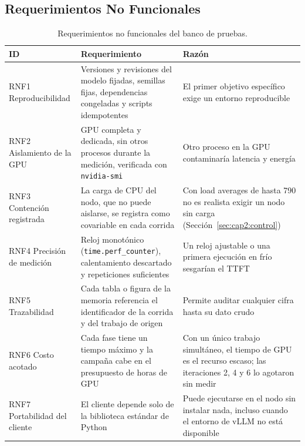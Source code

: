 
\subsection{Requerimientos No Funcionales}
\label{sec:cap2:rnf}

\begin{table}[htbp]
  \centering
  \caption{Requerimientos no funcionales del banco de pruebas.}
  \label{tab:cap2:rnf}
  \footnotesize
  \begin{tabular}{|p{}|p{}|p{}|}
    \hline
    \textbf{ID} & \textbf{Requerimiento} & \textbf{Razón} \\
    \hline
    RNF1 Reproducibilidad & Versiones y revisiones del modelo fijadas, semillas fijas, dependencias congeladas y scripts idempotentes & El primer objetivo específico exige un entorno reproducible \\
    \hline
    RNF2 Aislamiento de la GPU & GPU completa y dedicada, sin otros procesos durante la medición, verificada con \texttt{nvidia-smi} & Otro proceso en la GPU contaminaría latencia y energía \\
    \hline
    RNF3 Contención registrada & La carga de CPU del nodo, que no puede aislarse, se registra como covariable en cada corrida & Con load averages de hasta 790 no es realista exigir un nodo sin carga (Sección~\ref{sec:cap2:control}) \\
    \hline
    RNF4 Precisión de medición & Reloj monotónico (\texttt{time.perf\_counter}), calentamiento descartado y repeticiones suficientes & Un reloj ajustable o una primera ejecución en frío sesgarían el TTFT \\
    \hline
    RNF5 Trazabilidad & Cada tabla o figura de la memoria referencia el identificador de la corrida y del trabajo de origen & Permite auditar cualquier cifra hasta su dato crudo \\
    \hline
    RNF6 Costo acotado & Cada fase tiene un tiempo máximo y la campaña cabe en el presupuesto de horas de GPU & Con un único trabajo simultáneo, el tiempo de GPU es el recurso escaso; las iteraciones 2, 4 y 6 lo agotaron sin medir \\
    \hline
    RNF7 Portabilidad del cliente & El cliente depende solo de la biblioteca estándar de Python & Puede ejecutarse en el nodo sin instalar nada, incluso cuando el entorno de vLLM no está disponible \\
    \hline
  \end{tabular}
\end{table}

